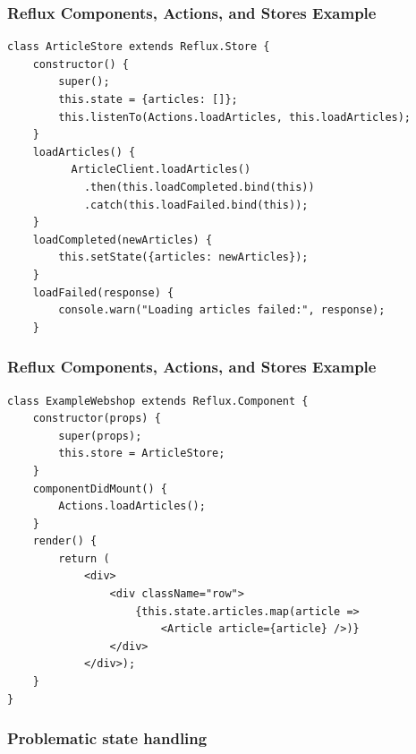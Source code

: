 \documentclass{beamer}
\begin{document}
\begin{frame}[fragile]\frametitle{Reflux Components, Actions, and Stores \textendash{} Example}
\begin{lstlisting}[style=htmlcssjs]
class ArticleStore extends Reflux.Store {
    constructor() {
        super();
        this.state = {articles: []};
        this.listenTo(Actions.loadArticles, this.loadArticles);
    }
    loadArticles() {
          ArticleClient.loadArticles()
            .then(this.loadCompleted.bind(this))
            .catch(this.loadFailed.bind(this));
    }
    loadCompleted(newArticles) {
        this.setState({articles: newArticles});
    }
    loadFailed(response) {
        console.warn("Loading articles failed:", response);
    }
\end{lstlisting}
\end{frame}

\begin{frame}[fragile]\frametitle{Reflux Components, Actions, and Stores \textendash{} Example}
\begin{lstlisting}[style=htmlcssjs]
class ExampleWebshop extends Reflux.Component {
    constructor(props) {
        super(props);
        this.store = ArticleStore;
    }
    componentDidMount() {
        Actions.loadArticles();
    }
    render() {
        return (
            <div>
                <div className="row">
                    {this.state.articles.map(article =>
                        <Article article={article} />)}
                </div>
            </div>);
    }
}
\end{lstlisting}
\end{frame}

\begin{frame}\frametitle{Problematic state handling}
\begin{itemize}
\end{itemize}
\end{frame}
\end{document}
